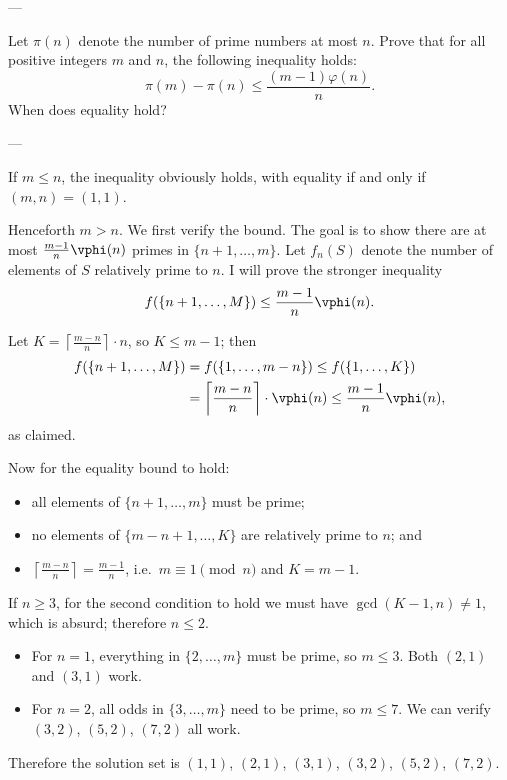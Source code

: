 
---

Let $\pi(n)$ denote the number of prime numbers at most $n$. Prove that for all positive integers $m$ and $n$, the following inequality holds:
\[\pi(m)-\pi(n)\le\frac{(m-1)\varphi(n)}n.\]
When does equality hold?

---

If $m\le n$, the inequality obviously holds, with equality if and only if $(m,n)=(1,1)$.

Henceforth $m>n$. We first verify the bound. The goal is to show there are at most $\frac{m-1}n\vphi(n)$ primes in $\{n+1,\ldots,m\}$. Let $f_n(S)$ denote the number of elements of $S$ relatively prime to $n$. I will prove the stronger inequality
\[f(\{n+1,\ldots,M\})\le\frac{m-1}n\vphi(n).\]

Let $K=\left\lceil\frac{m-n}n\right\rceil\cdot n$, so $K\le m-1$; then 
\begin{align*}
    f(\{n+1,\ldots,M\})&=f(\{1,\ldots,m-n\})\le f(\{1,\ldots,K\})\\
    &=\left\lceil\frac{m-n}n\right\rceil\cdot\vphi(n)\le\frac{m-1}n\vphi(n),
\end{align*}
as claimed.

Now for the equality bound to hold:
\begin{itemize}[itemsep=0em]
    \item all elements of $\{n+1,\ldots,m\}$ must be prime;
    \item no elements of $\{m-n+1,\ldots,K\}$ are relatively prime to $n$; and
    \item $\left\lceil\frac{m-n}n\right\rceil=\frac{m-1}n$, i.e.\ $m\equiv1\pmod n$ and $K=m-1$.
\end{itemize}
If $n\ge3$, for the second condition to hold we must have $\gcd(K-1,n)\ne1$, which is absurd; therefore $n\le2$.
\begin{itemize}
    \item For $n=1$, everything in $\{2,\ldots,m\}$ must be prime, so $m\le3$. Both $(2,1)$ and $(3,1)$ work.
    \item For $n=2$, all odds in $\{3,\ldots,m\}$ need to be prime, so $m\le7$. We can verify $(3,2)$, $(5,2)$, $(7,2)$ all work.
\end{itemize}
Therefore the solution set is $(1,1)$, $(2,1)$, $(3,1)$, $(3,2)$, $(5,2)$, $(7,2)$.
